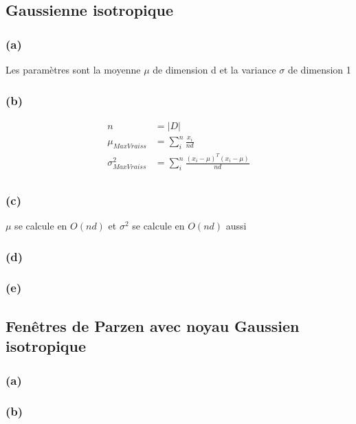\documentclass{article}
\begin{document}
	\subsection{Gaussienne isotropique}
	
	\subsubsection*{(a)}
	Les paramètres sont la moyenne $\mu$ de dimension d et la variance $\sigma$ de dimension 1 \\
	
	
	\subsubsection*{(b)}
	\begin{equation}
	\begin{split}
		n &= |D| \\
		\mu_{MaxVraiss} &= \sum_{i}^{n} \frac{x_{i}}{nd} \\
		\sigma_{MaxVraiss}^{2} &= \sum_{i}^{n} \frac{(x_{i}- \mu)^{T}(x_{i} - \mu)}{nd} \\
	\end{split}
	\end{equation}
	
	\subsubsection*{(c)}
	$\mu$ se calcule en $O(nd)$  et $\sigma^{2} $ se calcule en $O(nd)$ aussi\\
	\subsubsection*{(d)}
	
	\subsubsection*{(e)}
	
	
	\subsection{Fenêtres de Parzen avec noyau Gaussien isotropique}
	
	\subsubsection*{(a)}
	
	\subsubsection*{(b)}
	
\end{document}
